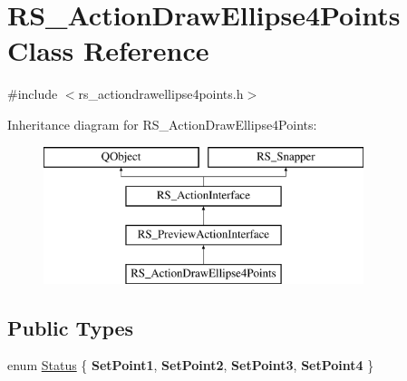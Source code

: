 \hypertarget{classRS__ActionDrawEllipse4Points}{\section{R\-S\-\_\-\-Action\-Draw\-Ellipse4\-Points Class Reference}
\label{classRS__ActionDrawEllipse4Points}
}


{\ttfamily \#include $<$rs\-\_\-actiondrawellipse4points.\-h$>$}

Inheritance diagram for R\-S\-\_\-\-Action\-Draw\-Ellipse4\-Points\-:\begin{figure}[H]
\begin{center}
\leavevmode
\includegraphics[height=4.000000cm]{classRS__ActionDrawEllipse4Points}
\end{center}
\end{figure}
\subsection*{Public Types}
\begin{DoxyCompactItemize}
\item 
enum \hyperlink{classRS__ActionDrawEllipse4Points_a1fb78a0bac1186aa7984105108927c52}{Status} \{ {\bfseries Set\-Point1}, 
{\bfseries Set\-Point2}, 
{\bfseries Set\-Point3}, 
{\bfseries Set\-Point4}
 \}
\end{DoxyCompactItemize}
